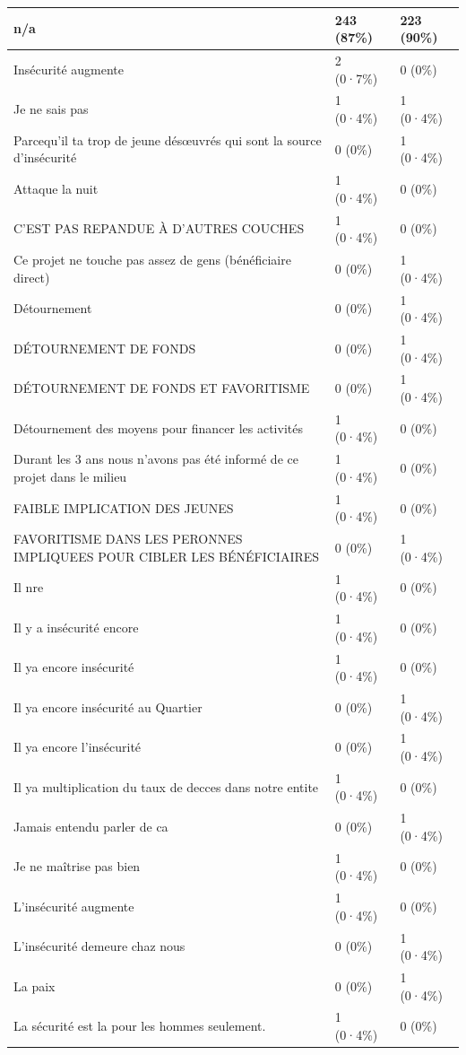 \documentclass[
]{book}
\begin{document}
\begin{tabular}{l|l|l}
\hline
n/a & 243 (87\%) & 223 (90\%)\\
\hline
Insécurité augmente & 2 (0·7\%) & 0 (0\%)\\
\hline
Je ne sais pas & 1 (0·4\%) & 1 (0·4\%)\\
\hline
Parcequ'il ta trop de jeune désœuvrés qui sont la source d'insécurité & 0 (0\%) & 1 (0·4\%)\\
\hline
Attaque la nuit & 1 (0·4\%) & 0 (0\%)\\
\hline
C'EST PAS REPANDUE À D'AUTRES COUCHES & 1 (0·4\%) & 0 (0\%)\\
\hline
Ce projet ne touche pas assez de gens (bénéficiaire direct) & 0 (0\%) & 1 (0·4\%)\\
\hline
Détournement & 0 (0\%) & 1 (0·4\%)\\
\hline
DÉTOURNEMENT DE FONDS & 0 (0\%) & 1 (0·4\%)\\
\hline
DÉTOURNEMENT DE FONDS ET FAVORITISME & 0 (0\%) & 1 (0·4\%)\\
\hline
Détournement des moyens pour financer les activités & 1 (0·4\%) & 0 (0\%)\\
\hline
Durant les 3 ans nous n'avons pas été informé de ce projet dans le milieu & 1 (0·4\%) & 0 (0\%)\\
\hline
FAIBLE IMPLICATION DES JEUNES & 1 (0·4\%) & 0 (0\%)\\
\hline
FAVORITISME DANS LES PERONNES IMPLIQUEES POUR CIBLER LES BÉNÉFICIAIRES & 0 (0\%) & 1 (0·4\%)\\
\hline
Il nre & 1 (0·4\%) & 0 (0\%)\\
\hline
Il y a insécurité encore & 1 (0·4\%) & 0 (0\%)\\
\hline
Il ya encore insécurité & 1 (0·4\%) & 0 (0\%)\\
\hline
Il ya encore insécurité au Quartier & 0 (0\%) & 1 (0·4\%)\\
\hline
Il ya encore l'insécurité & 0 (0\%) & 1 (0·4\%)\\
\hline
Il ya multiplication du taux de decces dans notre entite & 1 (0·4\%) & 0 (0\%)\\
\hline
Jamais entendu parler de ca & 0 (0\%) & 1 (0·4\%)\\
\hline
Je ne maîtrise pas bien & 1 (0·4\%) & 0 (0\%)\\
\hline
L'insécurité augmente & 1 (0·4\%) & 0 (0\%)\\
\hline
L'insécurité demeure chaz nous & 0 (0\%) & 1 (0·4\%)\\
\hline
La paix & 0 (0\%) & 1 (0·4\%)\\
\hline
La sécurité est la pour les hommes seulement. & 1 (0·4\%) & 0 (0\%)\\

\end{tabular}
\end{document}
